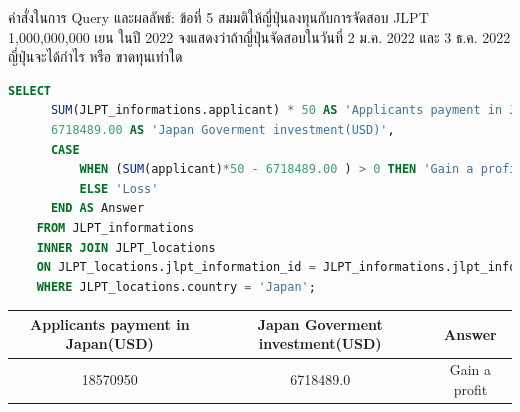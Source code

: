 \documentclass{beamer}
\begin{document}
\begin{frame}[fragile]{คำสั่งในการ Query และผลลัพธ์: ข้อที่ 5}
  สมมติให้ญี่ปุ่นลงทุนกับการจัดสอบ JLPT 1,000,000,000 เยน ในปี 2022 จงแสดงว่าถ้าญี่ปุ่นจัดสอบในวันที่ 2 ม.ค. 2022 และ 3 ธ.ค. 2022 ญี่ปุ่นจะได้กำไร หรือ ขาดทุนเท่าใด
  \begin{tiny}
    \begin{lstlisting}[language=SQL]
    SELECT 
      SUM(JLPT_informations.applicant) * 50 AS 'Applicants payment in Japan(USD)',
      6718489.00 AS 'Japan Goverment investment(USD)',
      CASE 
          WHEN (SUM(applicant)*50 - 6718489.00 ) > 0 THEN 'Gain a profit' 
          ELSE 'Loss' 
      END AS Answer
    FROM JLPT_informations
    INNER JOIN JLPT_locations
    ON JLPT_locations.jlpt_information_id = JLPT_informations.jlpt_information_id
    WHERE JLPT_locations.country = 'Japan';
    \end{lstlisting}
  \end{tiny}
  \begin{tiny}
  \begin{table}[ht]
  \centering
    \begin{tabular}{|c|c|c|}
      \hline
      \textbf{Applicants payment in Japan(USD)} & \textbf{Japan Goverment investment(USD)} & \textbf{Answer} \\
      \hline
      18570950 & 6718489.0 & Gain a profit \\
      \hline
    \end{tabular}
  \end{table}
  \end{tiny}
\end{frame}
\end{document}

